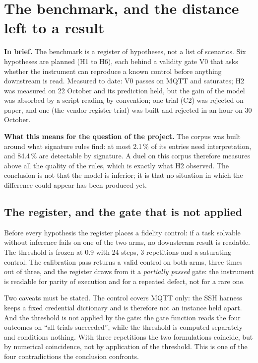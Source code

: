 \section{The benchmark, and the distance left to a result}
\label{sec:benchmark}

\textbf{In brief.} The benchmark is a register of hypotheses, not a list of
scenarios. Six hypotheses are planned (H1 to H6), each behind a validity gate V0
that asks whether the instrument can reproduce a known control before anything
downstream is read. Measured to date: V0 passes on MQTT and saturates; H2 was
measured on 22 October and its prediction held, but the gain of the model was
absorbed by a script reading by convention; one trial (C2) was rejected on paper,
and one (the vendor-register trial) was built and rejected in an hour on
30 October.

\textbf{What this means for the question of the project.} The corpus was built
around what signature rules find: at most 2.1\,\% of its entries need
interpretation, and 84.4\,\% are detectable by signature. A duel on this corpus
therefore measures above all the quality of the rules, which is exactly what H2
observed. The conclusion is not that the model is inferior; it is that no situation
in which the difference could appear has been produced yet.

\subsection{The register, and the gate that is not applied}

Before every hypothesis the register places a fidelity control: if a task solvable
without inference fails on one of the two arms, no downstream result is readable.
The threshold is frozen at 0.9 with 24 steps, 3 repetitions and a saturating
control. The calibration pass returns a valid control on both arms, three times out
of three, and the register draws from it a \emph{partially passed} gate: the
instrument is readable for parity of execution and for a repeated defect, not for a
rare one.

Two caveats must be stated. The control covers MQTT only: the SSH harness keeps a
fixed credential dictionary and is therefore not an instance held apart. And the
threshold is not applied by the gate: the gate function reads the four outcomes on
``all trials succeeded'', while the threshold is computed separately and conditions
nothing. With three repetitions the two formulations coincide, but by numerical
coincidence, not by application of the threshold. This is one of the four
contradictions the conclusion confronts.

